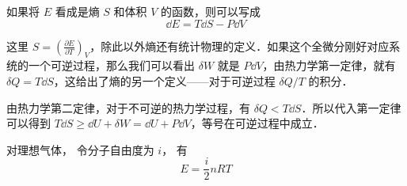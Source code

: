 如果将 $E$ 看成是熵 $S$  和体积 $V$ 的函数，则可以写成
\begin{equation}
\dd E=T\dd S-P\dd V
\end{equation}

这里 $S=\left(\frac{\partial E}{\partial T}\right)_V$，除此以外熵还有统计物理的定义．如果这个全微分刚好对应系统的一个可逆过程，那么我们可以看出 $\delta W$ 就是 $P\dd V$，由热力学第一定律，就有 $\delta Q=T\dd S$，这给出了熵的另一个定义——对于可逆过程 $\delta Q/T$ 的积分．

由热力学第二定律，对于不可逆的热力学过程，有 $\delta Q<T\dd S$．所以代入第一定律可以得到 $T\dd S\ge \dd U+\delta W=\dd U+P\dd V$，等号在可逆过程中成立．

对理想气体， 令分子自由度为 $i$， 有
\begin{equation}
E = \frac{i}{2}n RT
\end{equation}

